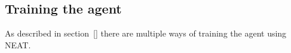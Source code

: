 




%





\subsection{Training the agent}
\label{sub:training-neat}
As described in section~\ref{} there are multiple ways of training the agent using NEAT.

